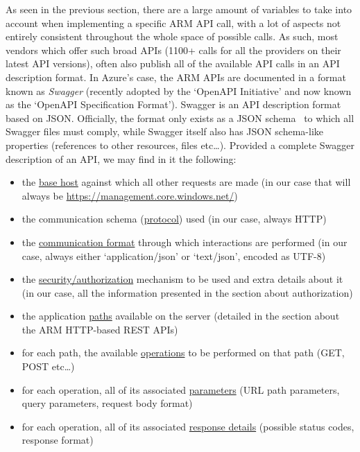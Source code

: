 \documentclass[11pt]{report}
\begin{document}
As seen in the previous section, there are a large amount of variables to take
into account when implementing a specific ARM API call, with a lot of aspects
not entirely consistent throughout the whole space of possible calls. As
such, most vendors which offer such broad APIs (1100+ calls for all the
providers on their latest API versions), often also publish all of the
available API calls in an API description format. In Azure's case, the ARM APIs
are documented \cite{azureApiSpecs} in a format known as \textit{Swagger}
(recently adopted by the `OpenAPI Initiative' \cite{openApiInitiative} and
now known as the  `OpenAPI Specification Format').
Swagger is an API description format based on JSON\@. Officially, the format only
exists as a JSON schema~\cite{swaggerSpecification} to which all Swagger files
must comply, while Swagger itself also has JSON schema-like properties (references
to other resources, files etc\ldots). Provided a complete Swagger description
of an API, we may find in it the following:

\begin{itemize}
    \item{} the \ul{base host} against which all other requests are made (in our
        case that will always be \url{https://management.core.windows.net/})
    \item{} the communication schema (\ul{protocol}) used (in our case,
        always HTTP)
    \item{} the \ul{communication format} through which interactions are
        performed (in our case, always either `application/json' or
        `text/json', encoded as UTF-8)
    \item{} the \ul{security/authorization} mechanism to be used and extra details
        about it (in our case, all the information presented in the section
        about authorization)
    \item{} the application \ul{paths} available on the server (detailed in the
        section about the ARM HTTP-based REST APIs)
    \item{} for each path, the available \ul{operations} to be performed on
        that path (GET, POST etc\ldots)
    \item{} for each operation, all of its associated \ul{parameters} (URL path
        parameters, query parameters, request body format)
    \item{} for each operation, all of its associated \ul{response details}
        (possible status codes, response format)
\end{itemize}
\end{document}
